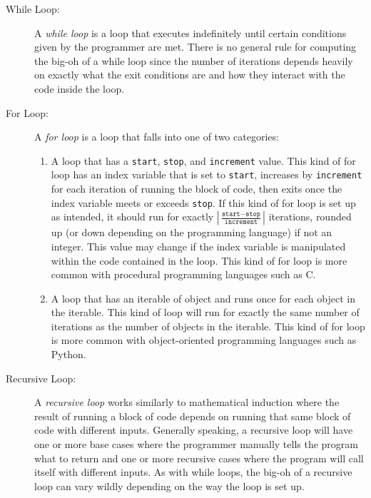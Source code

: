 \documentclass[11pt,oneside]{book}
\theoremstyle{definition}
\begin{document}
\begin{description}
    \item[While Loop:] A \emph{while loop} is a loop that executes indefinitely until certain conditions given by the programmer are met.
    There is no general rule for computing the big-oh of a while loop since the number of iterations depends heavily on exactly what the exit conditions are and how they interact with the code inside the loop.

    \item[For Loop:] A \emph{for loop} is a loop that falls into one of two categories:
    \begin{enumerate}[label=\alph*)]
        \item A loop that has a \texttt{start}, \texttt{stop}, and \texttt{increment} value.
        This kind of for loop has an index variable that is set to \texttt{start}, increases by \texttt{increment} for each iteration of running the block of code, then exits once the index variable meets or exceeds \texttt{stop}.
        If this kind of for loop is set up as intended, it should run for exactly $\left| \frac{\texttt{start} - \texttt{stop}}{\texttt{increment}} \right|$ iterations, rounded up (or down depending on the programming language) if not an integer.
        This value may change if the index variable is manipulated within the code contained in the loop.
        This kind of for loop is more common with procedural programming languages such as C.

        \item A loop that has an iterable of object and runs once for each object in the iterable.
        This kind of loop will run for exactly the same number of iterations as the number of objects in the iterable.
        This kind of for loop is more common with object-oriented programming languages such as Python.
    \end{enumerate}

    \item[Recursive Loop:] A \emph{recursive loop} works similarly to mathematical induction where the result of running a block of code depends on running that same block of code with different inputs.
    Generally speaking, a recursive loop will have one or more base cases where the programmer manually tells the program what to return and one or more recursive cases where the program will call itself with different inputs.
    As with while loops, the big-oh of a recursive loop can vary wildly depending on the way the loop is set up.

\end{description}
\end{document}
